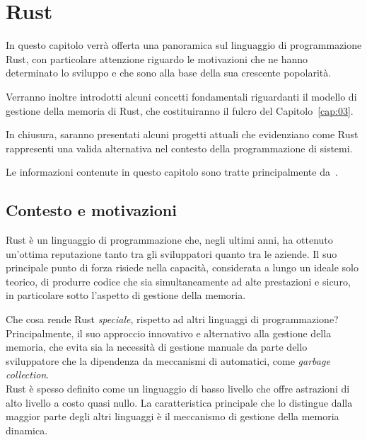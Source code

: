 
\chapter{Rust}\label{cap:02}

In questo capitolo verrà offerta una panoramica sul linguaggio di programmazione Rust, con particolare attenzione riguardo
le motivazioni che ne hanno determinato lo sviluppo e che sono alla base della sua crescente popolarità.

Verranno inoltre introdotti alcuni concetti fondamentali riguardanti il modello di gestione della memoria di Rust, 
che costituiranno il fulcro del Capitolo~\ref{cap:03}.

In chiusura, saranno presentati alcuni progetti attuali che evidenziano come Rust rappresenti una valida alternativa nel contesto della programmazione di sistemi.

Le informazioni contenute in questo capitolo sono tratte principalmente da~\cite{rust-2023-interview}.

\section{Contesto e motivazioni}
Rust è un linguaggio di programmazione che, negli ultimi anni, ha ottenuto un'ottima reputazione  
tanto tra gli sviluppatori quanto tra le aziende. Il suo principale punto di forza risiede nella 
capacità, considerata a lungo un ideale solo teorico, di produrre codice che sia simultaneamente 
ad alte prestazioni e sicuro, in particolare sotto l'aspetto di gestione della memoria.

Che cosa rende Rust \textit{speciale}, rispetto ad altri linguaggi di programmazione? Principalmente, 
il suo approccio innovativo e alternativo alla gestione della memoria, che evita sia la necessità di 
gestione manuale da parte dello sviluppatore che la dipendenza da meccanismi di automatici, come \textit{garbage collection}. \hfill
\vspace{15pt}\\
\noindent Rust è spesso definito come un linguaggio di basso livello 
che offre astrazioni di alto livello a costo quasi nullo.
La caratteristica principale che lo distingue dalla maggior parte degli altri linguaggi è il meccanismo
 di gestione della memoria dinamica. 

